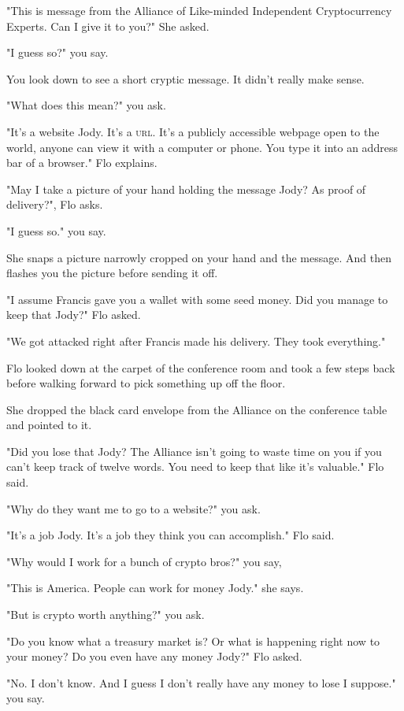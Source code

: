 \documentclass[a5paper, symmetric]{tufte-book}
\begin{document}
"This is message from the Alliance of Like-minded Independent Cryptocurrency Experts. Can I give it to you?" She asked. 

"I guess so?" you say. 

You look down to see a short cryptic message. It didn't really make sense. 

"What does this mean?" you ask. 

"It's a website Jody. It's a \textsc{url}. It's a publicly accessible webpage open to the world, anyone can view it with a computer or phone. You type it into an address bar of a browser." Flo explains. 

"May I take a picture of your hand holding the message Jody? As proof of delivery?", Flo asks. 

"I guess so." you say. 

She snaps a picture narrowly cropped on your hand and the message. And then flashes you the picture before sending it off. 

"I assume Francis gave you a wallet with some seed money. Did you manage to keep that Jody?" Flo asked. 

"We got attacked right after Francis made his delivery. They took everything." 

Flo looked down at the carpet of the conference room and took a few steps back before walking forward to pick something up off the floor. 

She dropped the black card envelope from the Alliance on the conference table and pointed to it.

"Did you lose that Jody? The Alliance isn't going to waste time on you if you can't keep track of twelve words. You need to keep that like it's valuable." Flo said. 

"Why do they want me to go to a website?" you ask.

"It's a job Jody. It's a job they think you can accomplish." Flo said. 

"Why would I work for a bunch of crypto bros?" you say,

"This is America. People can work for money Jody." she says.

"But is crypto worth anything?" you ask.

"Do you know what a treasury market is? Or what is happening right now to your money? Do you even have any money Jody?" Flo asked. 

"No. I don't know. And I guess I don't really have any money to lose I suppose." you say. 
\end{document}
